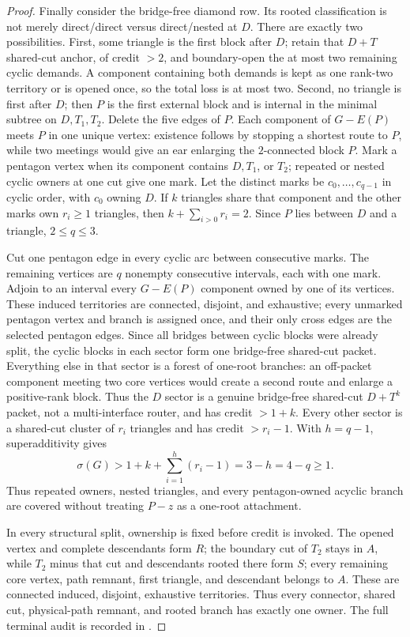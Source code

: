 \documentclass[11pt]{article}
\theoremstyle{remark}
\newcommand{\sig}{\sigma}
\begin{document}
\begin{proof}
Finally consider the bridge-free diamond row.  Its rooted classification is
not merely direct/direct versus direct/nested at $D$.  There are exactly two
possibilities.  First, some triangle is the first block after $D$; retain that
$D+T$ shared-cut anchor, of credit $>2$, and boundary-open the at most two
remaining cyclic demands.  A component containing both demands is kept as one
rank-two territory or is opened once, so the total loss is at most two.
Second, no triangle is first after $D$; then $P$ is the first external block
and is internal in the minimal subtree on $D,T_1,T_2$.  Delete the five edges
of $P$.  Each component of $G-E(P)$ meets $P$ in one unique vertex: existence
follows by stopping a shortest route to $P$, while two meetings would give an
ear enlarging the $2$-connected block $P$.  Mark a pentagon vertex when its
component contains $D,T_1$, or $T_2$; repeated or nested cyclic owners at one
cut give one mark.  Let the distinct marks be $c_0,\ldots,c_{q-1}$ in cyclic
order, with $c_0$ owning $D$.  If $k$ triangles share that component and the
other marks own $r_i\ge1$ triangles, then
$k+\sum_{i>0}r_i=2$.  Since $P$ lies between $D$ and a triangle,
$2\le q\le3$.

Cut one pentagon edge in every cyclic arc between consecutive marks.  The
remaining vertices are $q$ nonempty consecutive intervals, each with one mark.
Adjoin to an interval every $G-E(P)$ component owned by one of its vertices.
These induced territories are connected, disjoint, and exhaustive; every
unmarked pentagon vertex and branch is assigned once, and their only cross
edges are the selected pentagon edges.  Since all bridges between cyclic
blocks were already split, the cyclic blocks in each sector form one
bridge-free shared-cut packet.  Everything else in that sector is a forest of
one-root branches: an off-packet component meeting two core vertices would
create a second route and enlarge a positive-rank block.  Thus the $D$ sector
is a genuine bridge-free shared-cut $D+T^k$ packet, not a multi-interface
router, and has credit $>1+k$.  Every other sector is a shared-cut cluster of
$r_i$ triangles
and has credit $>r_i-1$.  With $h=q-1$, superadditivity gives
\[
 \sig(G)>1+k+\sum_{i=1}^{h}(r_i-1)=3-h=4-q\ge1.
\]
Thus repeated owners, nested triangles, and every pentagon-owned acyclic branch
are covered without treating $P-z$ as a one-root attachment.

In every structural split, ownership is fixed before credit is invoked.  The
opened vertex and complete descendants form $R$; the boundary cut of $T_2$
stays in $A$, while $T_2$ minus that cut and descendants rooted there form
$S$; every remaining core vertex, path remnant, first triangle, and descendant
belongs to $A$.  These are connected induced, disjoint, exhaustive territories.
Thus every connector, shared cut, physical-path remnant, and rooted branch has
exactly one owner.  The full terminal audit is recorded in
\cite{OwnerClosure,TerminalReduction}.
\end{proof}
\end{document}

